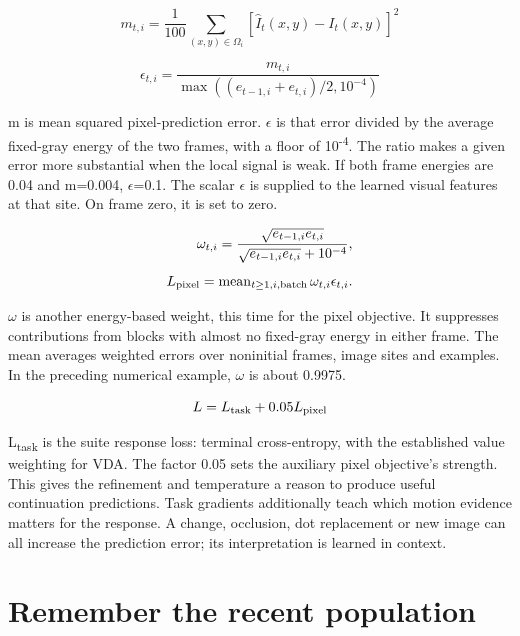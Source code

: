 \documentclass[11pt,letterpaper]{article}
\begin{document}
\begin{equation}m_{t,i}=\frac1{100}\sum_{(x,y)\in\Omega_i}[\widehat I_t(x,y)-I_t(x,y)]^2\end{equation}

\begin{equation}\epsilon_{t,i}=\frac{m_{t,i}}{\max((e_{t-1,i}+e_{t,i})/2,10^{-4})}\end{equation}

m is mean squared pixel-prediction error. \(\epsilon\) is that error divided by the average fixed-gray energy of the two frames, with a floor of 10\textsuperscript{-4}. The ratio makes a given error more substantial when the local signal is weak. If both frame energies are 0.04 and m=0.004, \(\epsilon\)=0.1. The scalar \(\epsilon\) is supplied to the learned visual features at that site. On frame zero, it is set to zero.


\begin{equation}\begin{aligned}\omega_{t,i}=\frac{\sqrt{e_{t-1,i}e_{t,i}}}{\sqrt{e_{t-1,i}e_{t,i}}+10^{-4}},\\[4pt]L_{\rm pixel}=\operatorname{mean}_{t\geq1,i,\mathrm{batch}}\omega_{t,i}\epsilon_{t,i}.\end{aligned}\end{equation}

\(\omega\) is another energy-based weight, this time for the pixel objective. It suppresses contributions from blocks with almost no fixed-gray energy in either frame. The mean averages weighted errors over noninitial frames, image sites and examples. In the preceding numerical example, \(\omega\) is about 0.9975.


\begin{equation}L=L_{\rm task}+0.05L_{\rm pixel}\end{equation}

L\textsubscript{task} is the suite response loss: terminal cross-entropy, with the established value weighting for VDA. The factor 0.05 sets the auxiliary pixel objective's strength. This gives the refinement and temperature a reason to produce useful continuation predictions. Task gradients additionally teach which motion evidence matters for the response. A change, occlusion, dot replacement or new image can all increase the prediction error; its interpretation is learned in context.


\clearpage

\section{Remember the recent population}\label{sec11}
\end{document}
